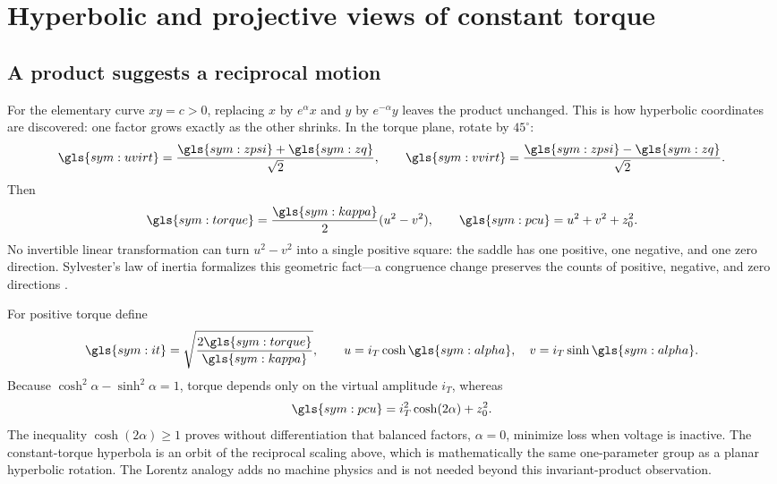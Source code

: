 \section{Hyperbolic and projective views of constant torque}
\label{sec:hyperbolic}

\subsection{A product suggests a reciprocal motion}

For the elementary curve \(xy=c>0\), replacing
\(x\) by \(e^\alpha x\) and \(y\) by \(e^{-\alpha}y\) leaves the product
unchanged. This is how hyperbolic coordinates are discovered: one factor grows
exactly as the other shrinks. In the torque plane, rotate by \(45^\circ\):
\begin{equation}
 \gls{sym:uvirt}=\frac{\gls{sym:zpsi}+\gls{sym:zq}}{\sqrt2},\qquad
 \gls{sym:vvirt}=\frac{\gls{sym:zpsi}-\gls{sym:zq}}{\sqrt2}.
 \label{eq:uv-rotation}
\end{equation}
Then
\begin{equation}
 \gls{sym:torque}=\frac{\gls{sym:kappa}}2(u^2-v^2),\qquad
 \gls{sym:pcu}=u^2+v^2+z_0^2.
 \label{eq:signature-form}
\end{equation}
No invertible linear transformation can turn \(u^2-v^2\) into a single
positive square: the saddle has one positive, one negative, and one zero
direction. Sylvester's law of inertia formalizes this geometric fact---a
congruence change preserves the counts of positive, negative, and zero
directions \cite{horn2013}.

For positive torque define
\begin{equation}
 \gls{sym:it}=\sqrt{\frac{2\gls{sym:torque}}{\gls{sym:kappa}}},\qquad
 u=i_T\cosh\gls{sym:alpha},\quad v=i_T\sinh\gls{sym:alpha}.
 \label{eq:hyperbolic-coordinates}
\end{equation}
Because \(\cosh^2\alpha-\sinh^2\alpha=1\), torque depends only on the virtual
amplitude \(i_T\), whereas
\begin{equation}
 \gls{sym:pcu}=i_T^2\cosh(2\alpha)+z_0^2.
 \label{eq:hyperbolic-loss}
\end{equation}
The inequality \(\cosh(2\alpha)\geq1\) proves without differentiation that
balanced factors, \(\alpha=0\), minimize loss when voltage is inactive. The
constant-torque hyperbola is an orbit of the reciprocal scaling above, which
is mathematically the same one-parameter group as a planar hyperbolic
rotation. The Lorentz analogy adds no machine physics and is not needed beyond
this invariant-product observation.

